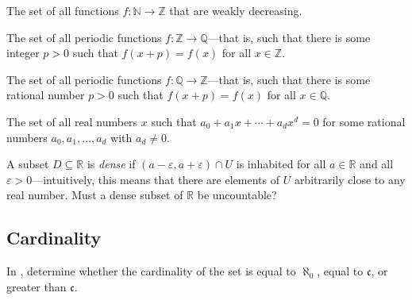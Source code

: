 \begin{chapex}
The set of all functions $f : \mathbb{N} \to \mathbb{Z}$ that are weakly decreasing.
\end{chapex}


\begin{chapex}
The set of all periodic functions $f : \mathbb{Z} \to \mathbb{Q}$---that is, such that there is some integer $p > 0$ such that $f(x+p) = f(x)$ for all $x \in \mathbb{Z}$.
\end{chapex}

\begin{chapex}
The set of all periodic functions $f : \mathbb{Q} \to \mathbb{Z}$---that is, such that there is some rational number $p > 0$ such that $f(x+p) = f(x)$ for all $x \in \mathbb{Q}$.
\end{chapex}

\begin{chapex}
\label{cqDetermineIfCountableEnd}
The set of all real numbers $x$ such that $a_0 + a_1x + \cdots + a_dx^d = 0$ for some rational numbers $a_0,a_1,\dots,a_d$ with $a_d \ne 0$.
\end{chapex}

\begin{chapex}
A subset $D \subseteq \mathbb{R}$ is \textit{dense} if $(a-\varepsilon, a+\varepsilon) \cap U$ is inhabited for all $a \in \mathbb{R}$ and all $\varepsilon > 0$---intuitively, this means that there are elements of $U$ arbitrarily close to any real number. Must a dense subset of $\mathbb{R}$ be uncountable?
\end{chapex}

\subsection*{Cardinality}

In , determine whether the cardinality of the set is equal to $\aleph_0$, equal to $\mathfrak{c}$, or greater than $\mathfrak{c}$.

